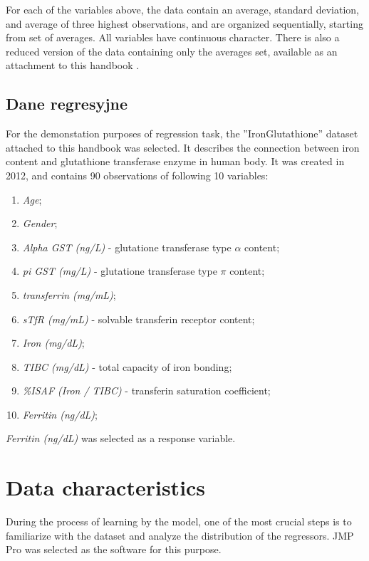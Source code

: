 	For each of the variables above, the data contain an average, standard deviation, and average of three highest observations, and are organized sequentially, starting from set of averages. All variables have continuous character. There is also a reduced version of the data containing only the averages set, available as an attachment to this handbook \cite{biostatisticsJMP}.
	
\subsection{Dane regresyjne}

	For the demonstation purposes of regression task, the ''IronGlutathione'' dataset attached to this handbook \cite{biostatisticsJMP} was selected. It describes the connection between iron content and glutathione transferase enzyme in human body. It was created in 2012, and contains 90 observations of following 10 variables:  
	
	\begin{enumerate}
		\item \textit{Age};
		\item \textit{Gender};
		\item \textit{Alpha GST (ng/L)} - glutatione transferase type $\alpha$ content;
		\item \textit{pi GST (mg/L)} - glutatione transferase type  $\pi$ content;
		\item \textit{transferrin (mg/mL)};
		\item \textit{sTfR (mg/mL)} - solvable transferin receptor content;
		\item \textit{Iron (mg/dL)};
		\item \textit{TIBC (mg/dL)} - total capacity of iron bonding;
		\item \textit{\%ISAF (Iron / TIBC)} - transferin saturation coefficient;
		\item \textit{Ferritin (ng/dL)};
	\end{enumerate} 
	
	\textit{Ferritin (ng/dL)} was selected as a response variable.
	
\section{Data characteristics}

	During the process of learning by the model, one of the most crucial steps is to familiarize with the dataset and analyze the distribution of the regressors. JMP Pro \cite{jmp} was selected as the software for this purpose.


